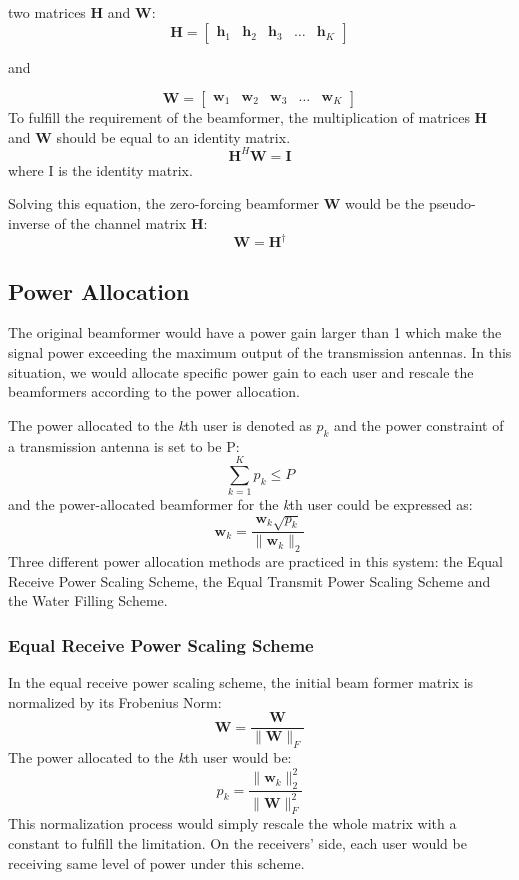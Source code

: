 \documentclass{article}
\begin{document}
two matrices \textbf{H} and \textbf{W}:
\[
\textbf{H}
=
\begin{bmatrix}
    \textbf{h}_{1} & \textbf{h}_{2} & \textbf{h}_{3} & \dots  & \textbf{h}_{K}
\end{bmatrix}
\]
\begin{center}
and
\end{center}
\[
\textbf{W}
=
\begin{bmatrix}
    \textbf{w}_{1} & \textbf{w}_{2} & \textbf{w}_{3} & \dots  & \textbf{w}_{K}
\end{bmatrix}
\]
To fulfill the requirement of the beamformer, the multiplication of matrices \textbf{H} and \textbf{W} should be equal to an identity matrix.
\[
\textbf{H}^H\textbf{W} = \textbf{I}
\]
where I is the identity matrix.

\noindent
Solving this equation, the zero-forcing beamformer \textbf{W} would be the pseudo-inverse of the channel matrix \textbf{H}:
\[
\textbf{W} = \textbf{H}^{\dagger}
\]

\subsection{Power Allocation}
The original beamformer would have a power gain larger than 1 which make the signal power exceeding the maximum output of the transmission antennas.
In this situation, we would allocate specific power gain to each user and rescale the beamformers according to the power allocation.

\noindent
The power allocated to the \textit{k}th user is denoted as $p_k$ and the power constraint of a transmission antenna is set to be P:
\[\sum_{k=1}^K p_k \leq P\]
and the power-allocated beamformer for the \textit{k}th user could be expressed as:
\[\textbf{w}_k = \frac{\textbf{w}_k\sqrt{p_k}}{\lVert \textbf{w}_k \rVert_{2}}\]
Three different power allocation methods are practiced in this system:
the Equal Receive Power Scaling Scheme, the Equal Transmit Power Scaling Scheme and the Water Filling Scheme.
\subsubsection{Equal Receive Power Scaling Scheme}
In the equal receive power scaling scheme, the initial beam former matrix is normalized by its Frobenius Norm:
\[
\textbf{W} = \frac{\textbf{W}}{\lVert \textbf{W} \rVert_{F}}
\]
The power allocated to the \textit{k}th user would be:
\[p_k = \frac{\lVert \textbf{w}_k \rVert_{2}^2}{\lVert \textbf{W} \rVert_{F}^2}\]
This normalization process would simply rescale the whole matrix with a constant to fulfill the limitation.
On the receivers' side, each user would be receiving same level of power under this scheme.
\end{document}

